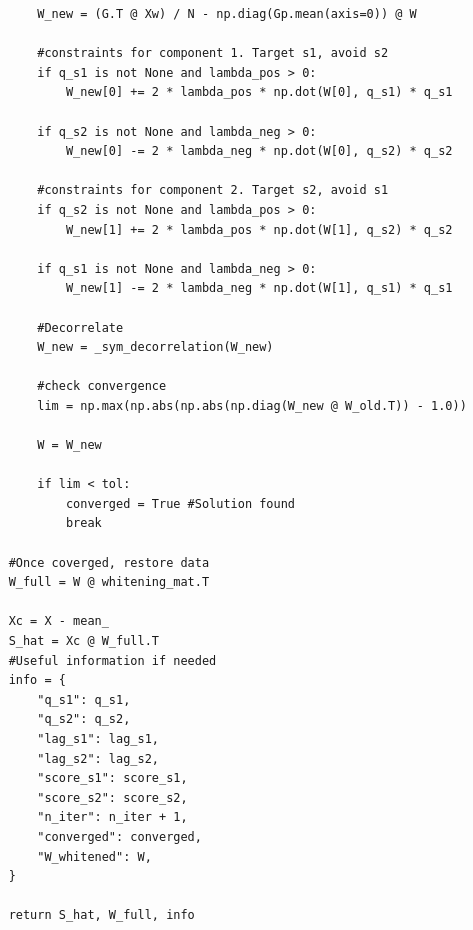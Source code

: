\begin{lstlisting}
        W_new = (G.T @ Xw) / N - np.diag(Gp.mean(axis=0)) @ W

        #constraints for component 1. Target s1, avoid s2
        if q_s1 is not None and lambda_pos > 0:
            W_new[0] += 2 * lambda_pos * np.dot(W[0], q_s1) * q_s1

        if q_s2 is not None and lambda_neg > 0:
            W_new[0] -= 2 * lambda_neg * np.dot(W[0], q_s2) * q_s2

        #constraints for component 2. Target s2, avoid s1
        if q_s2 is not None and lambda_pos > 0:
            W_new[1] += 2 * lambda_pos * np.dot(W[1], q_s2) * q_s2

        if q_s1 is not None and lambda_neg > 0:
            W_new[1] -= 2 * lambda_neg * np.dot(W[1], q_s1) * q_s1

        #Decorrelate
        W_new = _sym_decorrelation(W_new)

        #check convergence
        lim = np.max(np.abs(np.abs(np.diag(W_new @ W_old.T)) - 1.0))

        W = W_new

        if lim < tol:
            converged = True #Solution found
            break

    #Once coverged, restore data
    W_full = W @ whitening_mat.T

    Xc = X - mean_
    S_hat = Xc @ W_full.T
    #Useful information if needed
    info = {
        "q_s1": q_s1,
        "q_s2": q_s2,
        "lag_s1": lag_s1,
        "lag_s2": lag_s2,
        "score_s1": score_s1,
        "score_s2": score_s2,
        "n_iter": n_iter + 1,
        "converged": converged,
        "W_whitened": W,
    }

    return S_hat, W_full, info
\end{lstlisting}
